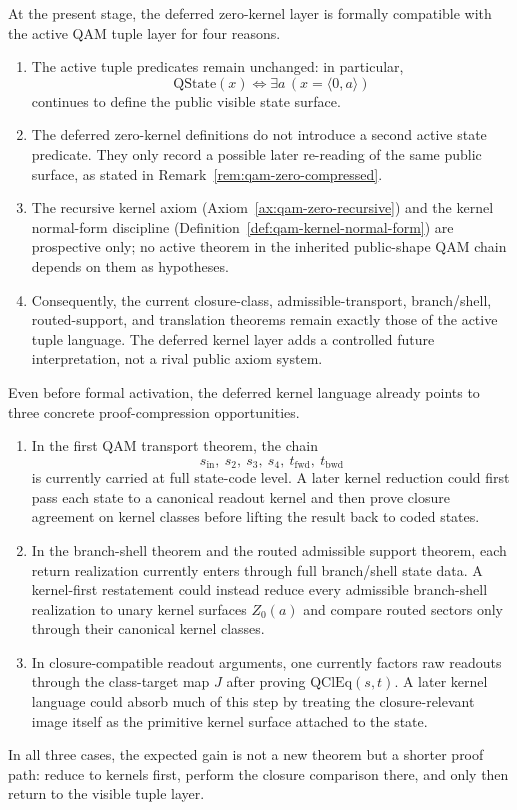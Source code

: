 \begin{remark}\label{rem:qam-zero-axiom-audit}
At the present stage, the deferred zero-kernel layer is formally compatible with the active QAM tuple layer for four reasons.
\begin{enumerate}
\item The active tuple predicates remain unchanged: in particular,
\[
\mathrm{QState}(x)\Longleftrightarrow \exists a\,(x=\langle 0,a\rangle)
\]
continues to define the public visible state surface.
\item The deferred zero-kernel definitions do not introduce a second active state predicate. They only record a possible later re-reading of the same public surface, as stated in Remark~\ref{rem:qam-zero-compressed}.
\item The recursive kernel axiom (Axiom~\ref{ax:qam-zero-recursive}) and the kernel normal-form discipline (Definition~\ref{def:qam-kernel-normal-form}) are prospective only; no active theorem in the inherited public-shape QAM chain depends on them as hypotheses.
\item Consequently, the current closure-class, admissible-transport, branch/shell, routed-support, and translation theorems remain exactly those of the active tuple language. The deferred kernel layer adds a controlled future interpretation, not a rival public axiom system.
\end{enumerate}
\end{remark}

\begin{remark}\label{rem:qam-zero-proof-opportunities}
Even before formal activation, the deferred kernel language already points to three concrete proof-compression opportunities.
\begin{enumerate}
\item In the first QAM transport theorem, the chain
\[
s_{\mathrm{in}},\ s_2,\ s_3,\ s_4,\ t_{\mathrm{fwd}},\ t_{\mathrm{bwd}}
\]
is currently carried at full state-code level. A later kernel reduction could first pass each state to a canonical readout kernel and then prove closure agreement on kernel classes before lifting the result back to coded states.
\item In the branch-shell theorem and the routed admissible support theorem, each return realization currently enters through full branch/shell state data. A kernel-first restatement could instead reduce every admissible branch-shell realization to unary kernel surfaces $Z_0(a)$ and compare routed sectors only through their canonical kernel classes.
\item In closure-compatible readout arguments, one currently factors raw readouts through the class-target map $J$ after proving $\mathrm{QClEq}(s,t)$. A later kernel language could absorb much of this step by treating the closure-relevant image itself as the primitive kernel surface attached to the state.
\end{enumerate}
In all three cases, the expected gain is not a new theorem but a shorter proof path: reduce to kernels first, perform the closure comparison there, and only then return to the visible tuple layer.
\end{remark}

